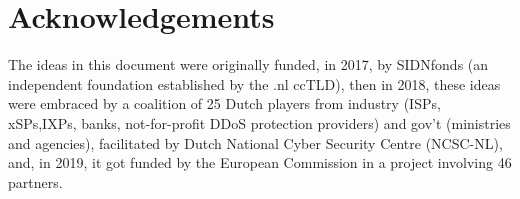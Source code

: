 \section*{Acknowledgements}

The ideas in this document were originally funded, in 2017, by SIDNfonds (an independent foundation established by the .nl ccTLD), then in 2018, these ideas were embraced by a coalition of 25 Dutch players from industry (ISPs, xSPs,IXPs, banks, not-for-profit DDoS protection providers) and gov’t (ministries and agencies), facilitated by Dutch National Cyber Security Centre (NCSC-NL), and, in 2019, it got funded by the European Commission in a project involving 46 partners.